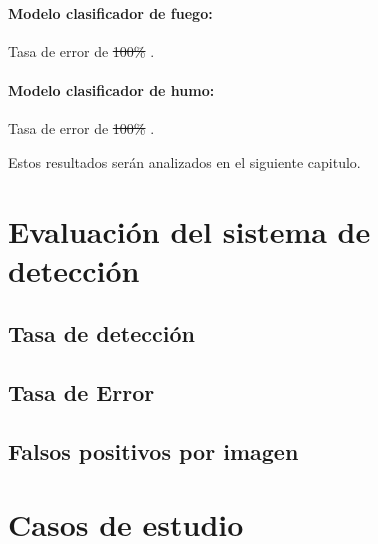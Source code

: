 \paragraph{Modelo clasificador de fuego:} Tasa de error de \sout{100\% }.

\paragraph{Modelo clasificador de humo:} Tasa de error de \sout{100\% }.

\noindent Estos resultados serán analizados en el siguiente capitulo.

\section{Evaluación del sistema de detección}

\subsection{Tasa de detección}

\subsection{Tasa de Error}

\subsection{Falsos positivos por imagen}

\section{Casos de estudio}